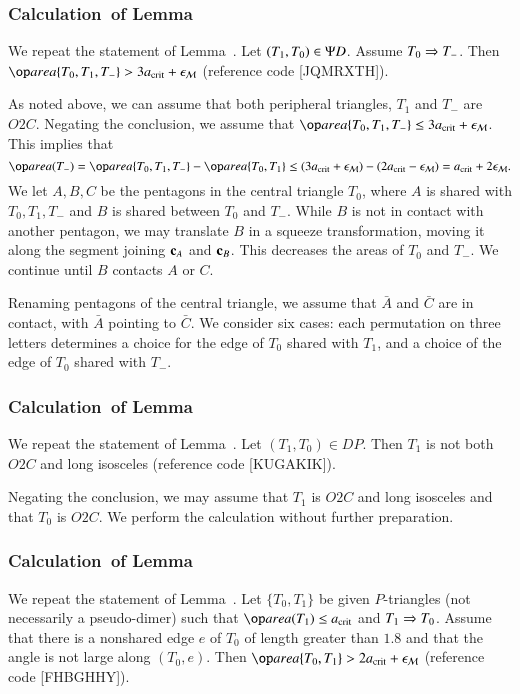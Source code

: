 \subsubsection{Calculation~of Lemma~}

We repeat the statement of Lemma~.  Let
$(T_1,T_0)\in\Psi D$. Assume $T_0\Rightarrow T_-$.  Then $\area\{T_0,T_1,T_-\} >
3\acrit + \epsM$ (reference code [JQMRXTH]).

As noted above, we can assume that both peripheral triangles, $T_1$
and $T_-$ are $O2C$.  Negating the conclusion, we assume that
$\area\{T_0,T_1,T_-\}\le 3\acrit+\epsM$.  This implies that
\[
\area(T_-) = \area\{T_0,T_1,T_-\} - \area\{T_0,T_1\} 
\le (3\acrit+\epsM) - (2\acrit - \epsM) = \acrit + 2\epsM.
\]
We let $A,B,C$ be the pentagons in the central triangle $T_0$, where
$A$ is shared with $T_0,T_1,T_-$ and $B$ is shared between $T_0$ and
$T_-$.  While $B$ is not in contact with another pentagon, we may
translate $B$ in a squeeze transformation, moving it along the segment
joining ${\mathbf c}_A$ and ${\mathbf c}_B$.  This decreases the areas of $T_0$ and
$T_-$.  We continue until $B$ contacts $A$ or $C$.

Renaming pentagons of the central triangle, we assume that $\bar A$
and $\bar C$ are in contact, with $\bar A$ pointing to $\bar C$.  We
consider six cases: each permutation on three letters determines a
choice for the edge of $T_0$ shared with $T_1$, and a choice of the
edge of $T_0$ shared with $T_-$.

\subsubsection{Calculation~of Lemma~}

We repeat the statement of Lemma~.  Let
$(T_1,T_0)\in DP$.  Then $T_1$ is not both $O2C$ and long isosceles
(reference code [KUGAKIK]).

Negating the conclusion, we may assume that $T_1$ is $O2C$ and long
isosceles and that $T_0$ is $O2C$.  We perform the calculation without
further preparation.

\subsubsection{Calculation~of Lemma~} %

We repeat the statement of Lemma~.  Let $\{T_0,T_1\}$
be given $P$-triangles (not necessarily a pseudo-dimer) such that
$\area(T_1)\le \acrit$ and $T_1\Rightarrow T_0$.  Assume that there is a
nonshared edge $e$ of $T_0$ of length greater than $1.8$ and that the
angle is not large along $(T_0,e)$.  Then $\area\{T_0,T_1\} > 2\acrit
+ \epsM$ (reference code [FHBGHHY]).

